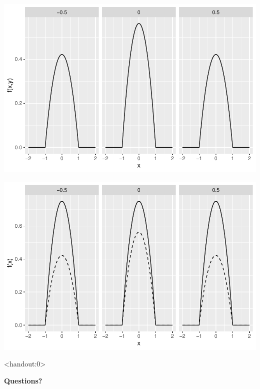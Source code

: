 \begin{frame}
  \begin{block}{\examplectd}
    \begin{center}
      \includegraphics[height = .7\textheight]{figure/example2-1-1}
    \end{center}
  \end{block}
\end{frame}

\begin{frame}
  \begin{block}{\examplectd}
    \begin{center}
      \includegraphics[height = .7\textheight]{figure/example2-1-2}
    \end{center}
  \end{block}
\end{frame}

\begin{frame}<handout:0>
  \begin{center}
    \Huge{\textbf{Questions?}}
  \end{center}
\end{frame}


